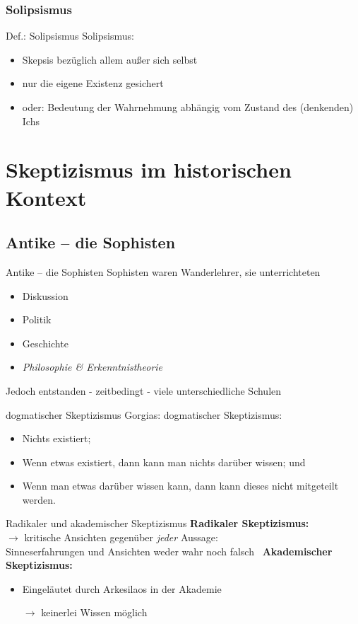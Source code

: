 \documentclass[12pt]{beamer}
\begin{document}
\subsubsection{Solipsismus}
\begin{frame}{Def.: Solipsismus}
Solipsismus:
\begin{itemize}
\item Skepsis bezüglich allem außer sich selbst
\item nur die eigene Existenz gesichert
\item oder: Bedeutung der Wahrnehmung abhängig vom Zustand des (denkenden) Ichs \cite{iep_solipsis}
\end{itemize}
\end{frame}

\section{Skeptizismus im historischen Kontext}
\subsection{Antike – die Sophisten}
\begin{frame}{Antike – die Sophisten}
Sophisten waren Wanderlehrer, sie unterrichteten
\begin{itemize}
\item Diskussion
\item Politik
\item Geschichte
\item \emph{Philosophie \& Erkenntnistheorie}
\end{itemize}
Jedoch entstanden - zeitbedingt - viele unterschiedliche Schulen
\end{frame}

\begin{frame}{dogmatischer Skeptizismus}
Gorgias: dogmatischer Skeptizismus:
\begin{itemize}
\item Nichts existiert;
\item Wenn etwas existiert, dann kann man nichts darüber wissen; und
\item Wenn man etwas darüber wissen kann, dann kann dieses nicht mitgeteilt werden.\cite{iep_on-the-nonex}
\end{itemize}
\end{frame}

\begin{frame}{Radikaler und akademischer Skeptizismus}
\textbf{Radikaler Skeptizismus:}\\
$\rightarrow$ kritische Ansichten gegenüber \emph{jeder} Aussage:\\
\glqq Sinneserfahrungen und Ansichten  weder wahr noch falsch\grqq\ \cite{greek_stough}
\textbf{Akademischer Skeptizismus:}\\
\begin{itemize}
\item Eingeläutet durch Arkesilaos in der Akademie
\item[$\rightarrow$] keinerlei Wissen möglich
\end{itemize}
\end{frame}
\end{document}
